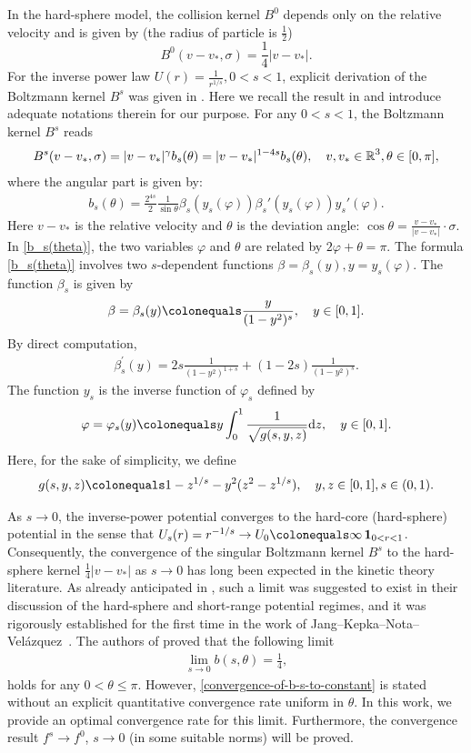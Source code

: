 \documentclass[reqno,10pt]{amsart}
\let\f=\frac
\let\vf=\varphi
\def\R{\mathop{\mathbb R\kern 0pt}\nolimits}
\def\th{\theta}
\newcommand{\ben}{\begin{eqnarray}}
\newcommand{\een}{\end{eqnarray}}
\theoremstyle{definition}
\numberwithin{equation}{section}
\begin{document}
In the hard-sphere model, the collision kernel $B^{0}$ depends only on the relative velocity and is given by (the radius of particle is $\frac{1}{2}$)
$$B^{0}(v-v_*,\sigma)=\frac{1}{4}|v-v_*|.$$
For the inverse power law $U(r)=\frac{1}{r^{1/s}}, 0<s<1$, 
explicit derivation of the Boltzmann kernel $B^{s}$ was given in \cite{Jang2023-df}. Here we recall the result in \cite{Jang2023-df} and introduce adequate notations therein for our purpose. For any $0<s<1$, 
the Boltzmann kernel  $B^{s}$  reads
\ben\label{1.3}
B^{s}(v-v_*,\sigma)=|v-v_*|^{\gamma}b_{s}(\theta)= |v-v_*|^{1-4s} b_{s}(\theta), \quad v,v_* \in \R^3, \theta \in [0,\pi],
\een
where the 
 angular part is given by:
\ben\label{b_s(theta)}
b_s(\th)=\frac{2^{4s}}{2}\frac{1}{\sin\th}\beta_s(y_s(\varphi))\beta_s'(y_s(\varphi))y_s'(\varphi).
\een
Here $v-v_*$ is the relative velocity and $\theta$ is the deviation angle: $\cos\theta = \frac{v-v_*}{|v-v_*|} \cdot \sigma$. In \eqref{b_s(theta)}, the two variables $\varphi$ and $\th$ are related by $2\varphi+\th=\pi$.   
The formula \eqref{b_s(theta)} involves two $s$-dependent functions $\beta=\beta_s(y), y=y_s(\varphi)$. The function $\beta_{s}$ is given by
\ben \label{function-beta-s-def}
\beta = \beta_{s}(y) \colonequals \frac{y}{(1-y^2)^{s}}, \quad  y \in [0,1].
\een
By direct computation, 
\ben \label{function-beta-s-derivative-def}
\beta_{s}^{\prime}(y) = 2s\frac{1}{(1-y^2)^{1+s}} + (1-2s)\frac{1}{(1-y^2)^{s}}
.
\een
The function $y_s$ is the inverse function of  $\vf_s$ defined by 
\ben \label{varphi-given-by-integral}
\varphi  =\varphi_{s}(y)  \colonequals y\int_{0}^{1}\frac{1}{\sqrt{g(s,y,z)}}\mathrm{d}z,\quad y \in[0,1].
\een 
Here, for the sake of simplicity, we define
\ben\label{def-of-g}
g(s,y,z)\colonequals 1-z^{1/s}-y^{2}(z^2-z^{1/s}), \quad y,z \in[0,1], s \in (0,1).
\een

As $s \to 0$, the inverse-power potential converges to the hard-core (hard-sphere) potential in the sense that 
$U_s(r)=r^{-1/s} \to U_{0} \colonequals \infty\,\mathbf{1}_{0<r<1}$.
Consequently, the convergence of the singular Boltzmann kernel $B^{s}$ to the hard-sphere kernel 
$\frac{1}{4}|v-v_*|$ as $s \to 0$ has long been expected in the kinetic theory literature.  
As already anticipated in \cite[Remark 1.0.1]{GST2013}, such a limit was suggested to exist in their discussion of the hard-sphere and short-range potential regimes, and it was rigorously established for the first time in the work of Jang--Kepka--Nota--Vel{\'a}zquez~\cite{Jang2023-df}. 
The authors of \cite[Theorem 1(i)]{Jang2023-df} proved that the following limit
\ben \label{convergence-of-b-s-to-constant}
\lim_{s \to 0 } b(s,\theta) = \f{1}{4},
\een
holds for any $0<\theta \leq  \pi$.
However, \eqref{convergence-of-b-s-to-constant} is stated without an explicit
quantitative convergence rate uniform in \(\theta\). 
 In this work, we provide an optimal convergence rate for this limit. Furthermore, the convergence result $f^s\to f^0$, $s\to0$ (in some suitable norms) will be proved.
\end{document}
